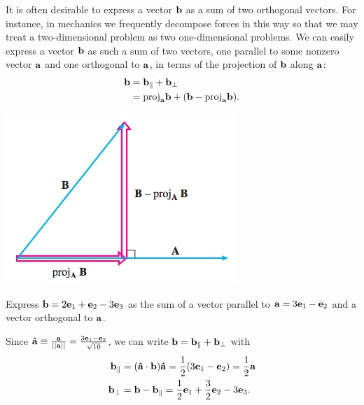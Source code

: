 \documentclass[12pt,letterpaper,reqno]{article}
\numberwithin{equation}{section}
\begin{document}
It is often desirable to express a vector ${\bf b}$ as a sum of two orthogonal vectors. For instance, in mechanics we frequently decompose forces in this way so that we may treat a two-dimensional problem as two one-dimensional problems. We can easily express a vector ${\bf b}$ as such a sum of two vectors, one parallel to some nonzero vector ${\bf a}$ and one orthogonal to ${\bf a}$, in terms of the projection of ${\bf b}$ along ${\bf a}$:
\begin{equation}
\begin{split}
	{\bf b}&={\bf b}_{\parallel}+{\bf b}_{\perp} \\
	&=\text{proj}_{\bf a}{\bf b}+({\bf b}-\text{proj}_{\bf a}{\bf b}).
\end{split}
\end{equation}

\begin{center}
	\includegraphics[scale=0.5]{figures_mvc/sum_of_orthogonal_vectors}
\end{center}

\begin{exercise}
	Express ${\bf b}=2{\bf e}_1+{\bf e}_2-3{\bf e}_3$ as the sum of a vector parallel to ${\bf a}=3{\bf e}_1-{\bf e}_2$ and a vector orthogonal to ${\bf a}$.
\end{exercise}

{\color{red} 
Since ${\bf \hat{a}}\equiv \frac{{\bf a}}{||{\bf a}||}=\frac{3{\bf e}_1-{\bf e}_2}{\sqrt{10}}$, we can write ${\bf b}={\bf b}_{\parallel}+{\bf b}_{\perp}$ with  
\begin{align*}
	{\bf b}_{\parallel}&=({\bf \hat{a}}\cdot {\bf b}){\bf {\hat{a}}}=\frac{1}{2}(3{\bf e}_1-{\bf e}_2)=\frac{1}{2}{\bf a} \\
	{\bf b}_{\perp}&={\bf b}-{\bf b}_{\parallel}=\frac{1}{2}{\bf e}_1+\frac{3}{2}{\bf e}_2-3{\bf e}_3.
\end{align*}}
\end{document}
